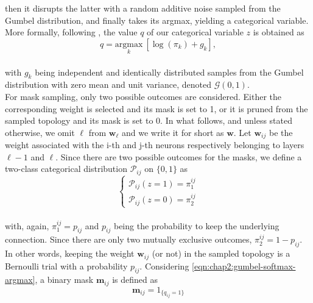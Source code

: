 then it disrupts the latter with a random additive noise sampled from the Gumbel
distribution, and finally takes its argmax, yielding a categorical
variable. More formally, following \cite{DBLP:conf/iclr/JangGP17}, the value $q$
of our categorical variable $z$ is obtained as \\

\begin{equation}
  \label{eqn:chap2:gumbel-softmax-argmax}
  q = \underset{k}{ \text{argmax}} \ [ \log(\pi_k)+g_k ],
\end{equation}\\

with $g_k$ being independent and identically distributed samples from  the
Gumbel distribution with zero mean and unit variance, denoted
$\mathcal{G}(0,1)$.\\

For mask sampling, only two possible outcomes are considered. Either the
corresponding weight is selected and its mask is set to 1, or it is pruned from
the sampled topology and its mask is set to 0. In what follows, and unless
stated otherwise, we omit $\ell$ from $\bm{w}_\ell$ and we write it for short as
$\bm{w}$. Let $\bm{w}_{ij}$ be the weight associated with the i-th and j-th
neurons respectively belonging to layers $\ell-1$ and $\ell$. Since there are
two possible outcomes for the masks, we define a two-class categorical
distribution $\mathcal{P}_{ij}$ on $\{0,1\}$ as\\

\begin{equation}
  \left\{ \begin{array}{c}
    \mathcal{P}_{ij}(z=1)=\pi_1^{ij} \\
    \mathcal{P}_{ij}(z=0)=\pi_2^{ij}
  \end{array} \right.
\end{equation}\\

with, again, $\pi_1^{ij}=p_{ij}$ and $p_{ij}$ being the probability to keep the
underlying connection. Since there are only two mutually exclusive outcomes,
$\pi_2^{ij}=1-p_{ij}$. In other words, keeping the weight $\bm{w}_{ij}$ (or not)
in the sampled topology is a Bernoulli trial with a probability $p_{ij}$.
Considering \cref{eqn:chap2:gumbel-softmax-argmax}, a binary mask  $\bm{m}_{ij}$
is defined as\\

\begin{equation}
  \label{eqn:chap2:mask_value}
  \bm{m}_{ij} = 1_{\{q_{ij}=1\}}
\end{equation}\\

